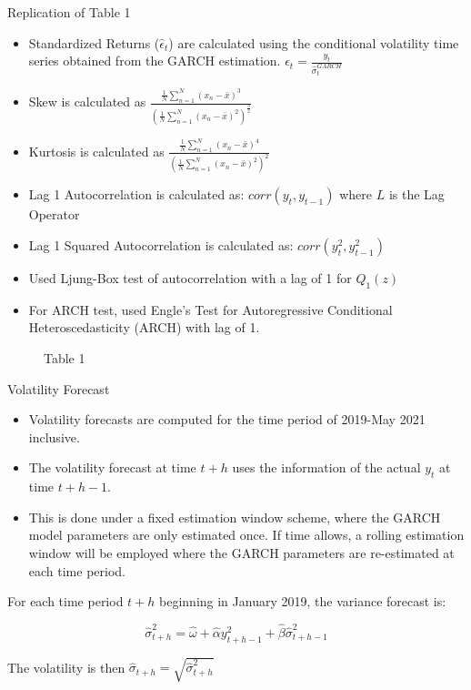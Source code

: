 \documentclass[9pt]{beamer}
\begin{document}
\begin{frame}{Replication of Table 1 \citeauthor{faias2017optimal}}
\begin{itemize}
    \item Standardized Returns ($\hat{\epsilon}_{t}$) are calculated using the conditional volatility time series obtained from the GARCH estimation. $\hat{\epsilon}_{t} = \frac{y_{t}}{\hat{\sigma}_{t}^{GARCH}}$
    \item Skew is calculated as $\frac{\frac{1}{N} \sum_{n = 1}^{N} (x_{n} - \bar{x})^{3}}{(\frac{1}{N}\sum_{n = 1}^{N} (x_{n} - \bar{x})^{2})^{\frac{3}{2}}}$
    \item Kurtosis is calculated as $\frac{\frac{1}{N} \sum_{n = 1}^{N} (x_{n} - \bar{x})^{4}}{(\frac{1}{N}\sum_{n = 1}^{N} (x_{n} - \bar{x})^{2})^{2}}$
    \item Lag 1 Autocorrelation is calculated as: $corr(y_{t}, y_{t-1})$ where $L$ is the Lag Operator
    \item Lag 1 Squared Autocorrelation is calculated as: $corr(y_{t}^{2}, y_{t-1}^{2})$
    \item Used Ljung-Box test of autocorrelation with a lag of 1 for $Q_{1}(z)$
    \item For ARCH test, used Engle’s Test for Autoregressive Conditional Heteroscedasticity (ARCH) with lag of 1.
\end{itemize} 
\end{frame}

\begin{frame}
    \begin{center}
        \begin{figure}
            \caption{Table 1}
            \scalebox{0.7}{}
        \end{figure}
    \end{center}
\end{frame}

\begin{frame}{Volatility Forecast}
\begin{itemize}
    \item Volatility forecasts are computed for the time period of 2019-May 2021 inclusive.
    \item The volatility forecast at time $t + h$ uses the information of the actual $y_{t}$ at time $t + h - 1$.
    \item This is done under a fixed estimation window scheme, where the GARCH model parameters are only estimated once. If time allows, a rolling estimation window will be employed where the GARCH parameters are re-estimated at each time period.
\end{itemize}

For each time period $t + h$ beginning in January 2019, the variance forecast is:

\[\hat{\sigma}_{t + h}^{2} = \hat{\omega} + \hat{\alpha} y_{t + h - 1}^{2} + \hat{\beta} \hat{\sigma}_{t + h - 1}^{2}\]

The volatility is then $\hat{\sigma}_{t + h} = \sqrt{\hat{\sigma}_{t + h}^{2}}$
\end{frame}
\end{document}
